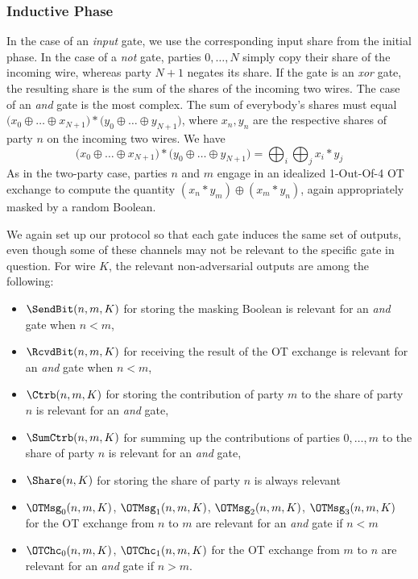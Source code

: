 \subsubsection{Inductive Phase}
In the case of an \emph{input} gate, we use the corresponding input share from the initial phase. In the case of a \emph{not} gate, parties $0,\ldots,N$ simply copy their share of the incoming wire, whereas party $N+1$ negates its share. If the gate is an \emph{xor} gate, the resulting share is the sum of the shares of the incoming two wires. The case of an \emph{and} gate is the most complex. The sum of everybody's shares must equal $\big(x_0 \oplus \ldots \oplus x_{N+1}\big) * \big(y_0 \oplus \ldots \oplus y_{N+1}\big)$, where $x_n,y_n$ are the respective shares of party $n$ on the incoming two wires. We have
\[\big(x_0 \oplus \ldots \oplus x_{N+1}\big) * \big(y_0 \oplus \ldots \oplus y_{N+1}\big) = \bigoplus_i \bigoplus_j x_i * y_j\]
As in the two-party case, parties $n$ and $m$ engage in an idealized 1-Out-Of-4 OT exchange to compute the quantity $(x_n * y_m) \oplus (x_m * y_n)$, again appropriately masked by a random Boolean.\medskip

We again set up our protocol so that each gate induces the same set of outputs, even though some of these channels may not be relevant to the specific gate in question. For wire $K$, the relevant non-adversarial outputs are among the following:
\begin{itemize}
\item $\SendBit(n,m,K)$ for storing the masking Boolean is relevant for an \emph{and} gate when $n < m$,
\item $\RcvdBit(n,m,K)$ for receiving the result of the OT exchange is relevant for an \emph{and} gate when $n < m$,
\item $\Ctrb(n,m,K)$ for storing the contribution of party $m$ to the share of party $n$ is relevant for an \emph{and} gate,
\item $\SumCtrb(n,m,K)$ for summing up the contributions of parties $0,\ldots,m$ to the share of party $n$ is relevant for an \emph{and} gate,
\item $\Share(n,K)$ for storing the share of party $n$ is always relevant
\item $\OTMsg_0(n,m,K)$, $\OTMsg_1(n,m,K)$, $\OTMsg_2(n,m,K)$, $\OTMsg_3(n,m,K)$ for the OT exchange from $n$ to $m$ are relevant for an \emph{and} gate if $n < m$
\item $\OTChc_0(n,m,K)$, $\OTChc_1(n,m,K)$ for the OT exchange from $m$ to $n$ are relevant for an \emph{and} gate if $n > m$.
\end{itemize}

